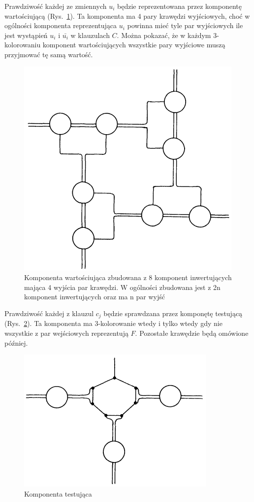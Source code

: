\documentclass[12pt]{article}
\begin{document}
Prawdziwość każdej ze zmiennych $u_i$ będzie reprezentowana przez komponentę wartościującą (Rys.~\ref{fig:var-set_component}). Ta komponenta ma 4 pary krawędzi wyjściowych, choć w ogólności komponenta reprezentująca $u_i$ powinna mieć tyle par wyjściowych ile jest wystąpień $u_i$ i $\bar{u_i}$ w klauzulach $C$. Można pokazać, że w każdym 3-kolorowaniu komponent wartościujących wszystkie pary wyjściowe muszą przyjmować tę samą wartość.

\begin{figure}[H]
    \centering
    \includegraphics[scale=1]{variable-setting_component.PNG}
    \caption{Komponenta wartościująca zbudowana z 8 komponent inwertujących mająca 4 wyjścia par krawędzi. W ogólności zbudowana jest z 2n komponent inwertujących oraz ma n par wyjść}
    \label{fig:var-set_component}
\end{figure}

Prawdziwość każdej z klauzul $c_j$ będzie sprawdzana przez komponętę testującą (Rys.~\ref{fig:test_component}). Ta komponenta ma 3-kolorowanie wtedy i tylko wtedy gdy nie wszystkie z par wejściowych reprezentują $F$. Pozostałe krawędzie będą omówione później.

\begin{figure}[H]
    \centering
    \includegraphics[scale=1]{satisfaction-testing_component.PNG}
    \caption{Komponenta testująca}
    \label{fig:test_component}
\end{figure}
\end{document}
